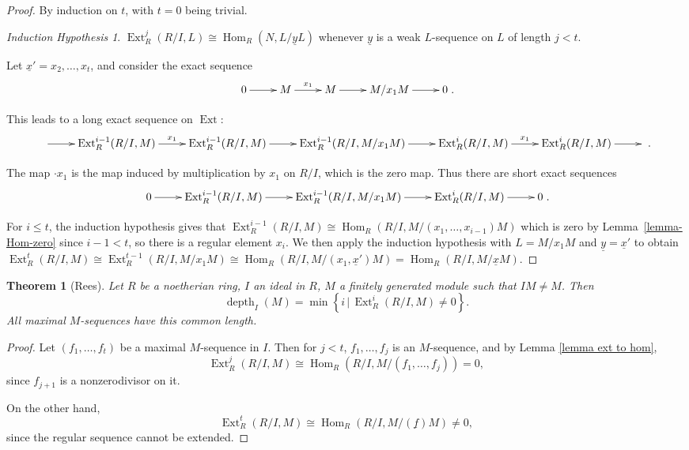 \documentclass[11pt]{book}
\newtheorem{theorem}{Theorem}[chapter]
\numberwithin{equation}{section}
\numberwithin{theorem}{chapter}
\theoremstyle{definition}
\newtheorem*{basic properties}{Basic Properties}
\newtheorem*{Important Remark}{Important Remark}
\theoremstyle{remark}
\newtheorem*{IH*}{Induction Hypothesis}
\newcommand{\Hom}{\operatorname{Hom}}
\newcommand{\Ext}{\operatorname{Ext}}
\newcommand{\depth}{\operatorname{depth}}
\begin{document}
\begin{proof}
By induction on $t$, with $t=0$ being trivial.
\begin{IH*} $\Ext^{j}_R (R/I, L) \cong \Hom_R(N, L/\underline{y}L)$ whenever $\underline{y}$ is a weak $L$-sequence on $L$ of length $j<t$.\end{IH*}
Let $\underline{x}'=x_2,\dots, x_{t}$, and consider the exact sequence
$$\xymatrix{0 \ar[r] & M \ar[r]^{x_1} & M \ar[r] & M/x_1 M \ar[r] & 0}.$$

This leads to a long exact sequence on $\Ext$:
{\small $$\xymatrix{\ar[r] &\Ext_R^{i-1}(R/I,M) \ar[r]^{x_1} & \Ext_R^{i-1}(R/I,M) \ar[r] & \Ext_R^{i-1}(R/I,M/x_1 M) \ar[r]  & \Ext_R^{i}(R/I,M) \ar[r]^{x_1} & \Ext_R^{i}(R/I,M) \ar[r] &}.$$}

The map $\cdot x_1$ is the map induced by multiplication by $x_1$ on $R/I$, which is the zero map. Thus there are short exact sequences
$$\xymatrix{ 0\ar[r] & \Ext_R^{i-1}(R/I,M) \ar[r] & \Ext_R^{i-1}(R/I,M/x_1 M) \ar[r]  & \Ext_R^{i}(R/I,M) \ar[r] & 0}.$$

For $i\leq t$, the induction hypothesis gives that $\Ext^{i-1}_R(R/I,M)\cong \Hom_R(R/I,M/(x_1,\dots,x_{i-1})M)$ which is zero by Lemma~\ref{lemma-Hom-zero} since $i-1<t$, so there is a regular element $x_i$. We then apply the induction hypothesis with $L=M/x_1 M$ and $\underline{y}=\underline{x}'$ to obtain $\Ext^t_R(R/I,M)\cong \Ext^{t-1}_R(R/I,M/x_1 M) \cong \Hom_R(R/I,M/(x_1,\underline{x}')M)= \Hom_R(R/I,M/\underline{x}M)$.
\end{proof}


\begin{theorem}[Rees]
	Let $R$ be a noetherian ring, $I$ an ideal in $R$, $M$ a finitely generated module such that $IM \neq M$. Then
	$$\depth_I(M) = \min \left\lbrace i \, | \, \Ext^i_R(R/I,M) \neq 0 \right\rbrace.$$
	All maximal $M$-sequences have this common length.
\end{theorem}


\begin{proof}
	Let $(f_1, \ldots, f_t)$ be a maximal $M$-sequence in $I$. Then for $j<t$, $f_1, \ldots, f_{j}$ is an $M$-sequence, and by Lemma \ref{lemma ext to hom},
	$$\Ext^{j}_R(R/I, M) \cong \Hom_R(R/I, M/(f_1, \ldots, f_{j})) = 0,$$
	since $f_{j+1}$ is a nonzerodivisor on it. 
	
	On the other hand,
	$$\Ext^{t}_R(R/I, M) \cong \Hom_R(R/I, M/(\underline{f})M) \neq 0,$$
	since the regular sequence cannot be extended.
\end{proof}
\end{document}
